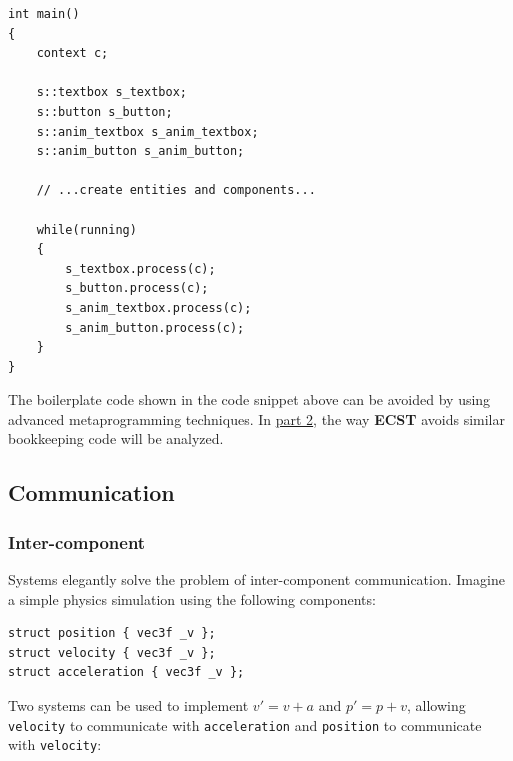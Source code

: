\documentclass[twoside, 12pt, a4paper, openany]{book}
\begin{document}
\begin{verbatim}
int main()
{
    context c;

    s::textbox s_textbox;
    s::button s_button;
    s::anim_textbox s_anim_textbox;
    s::anim_button s_anim_button;

    // ...create entities and components...

    while(running)
    {
        s_textbox.process(c);
        s_button.process(c);
        s_anim_textbox.process(c);
        s_anim_button.process(c);
    }
}
\end{verbatim}

The boilerplate code shown in the code snippet above can be avoided by
using advanced metaprogramming techniques. In
\protect\hyperlink{part2_ecst}{part 2}, the way \textbf{ECST} avoids
similar bookkeeping code will be analyzed.

\subsection{Communication}\label{communication-1}

\subsubsection{Inter-component}\label{inter-component}

Systems elegantly solve the problem of inter-component communication.
Imagine a simple physics simulation using the following components:

\begin{verbatim}
struct position { vec3f _v };
struct velocity { vec3f _v };
struct acceleration { vec3f _v };
\end{verbatim}

Two systems can be used to implement \(v' = v + a\) and \(p' = p + v\),
allowing
\texttt{velocity}
to communicate with
\texttt{acceleration}
and
\texttt{position}
to communicate with
\texttt{velocity}:
\end{document}

